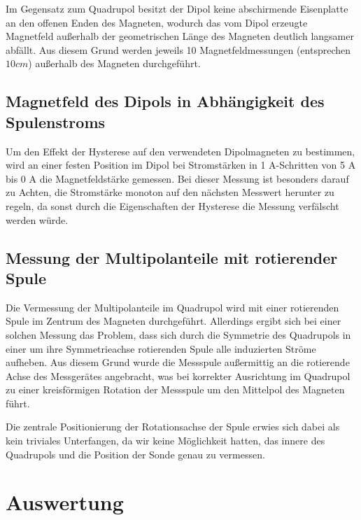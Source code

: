 \documentclass[bigchapter,colorback,accentcolor=tud4b,linedtoc,11pt]{tudreport}
\begin{document}
Im Gegensatz zum Quadrupol besitzt der Dipol keine abschirmende Eisenplatte an den offenen Enden des Magneten, wodurch das vom Dipol erzeugte Magnetfeld außerhalb der geometrischen Länge des Magneten deutlich langsamer abfällt. Aus diesem Grund werden jeweils 10 Magnetfeldmessungen (entsprechen $10 cm$) außerhalb des Magneten durchgeführt.

\section{Magnetfeld des Dipols in Abhängigkeit des Spulenstroms}

Um den Effekt der Hysterese auf den verwendeten Dipolmagneten zu bestimmen, wird an einer festen Position im Dipol bei Stromstärken in 1 A-Schritten von 5 A bis 0 A die Magnetfeldstärke gemessen. Bei dieser Messung ist besonders darauf zu Achten, die Stromstärke monoton auf den nächsten Messwert herunter zu regeln, da sonst durch die Eigenschaften der Hysterese die Messung verfälscht werden würde.

\section{Messung der Multipolanteile mit rotierender Spule}
Die Vermessung der Multipolanteile im Quadrupol wird mit einer rotierenden Spule im Zentrum des Magneten durchgeführt. Allerdings ergibt sich bei einer solchen Messung das Problem, dass sich durch die Symmetrie des Quadrupols in einer um ihre Symmetrieachse rotierenden Spule alle induzierten Ströme aufheben. Aus diesem Grund wurde die Messspule außermittig an die rotierende Achse des Messgerätes angebracht, was bei korrekter Ausrichtung im Quadrupol zu einer kreisförmigen Rotation der Messspule um den Mittelpol des Magneten führt.

Die zentrale Positionierung der Rotationsachse der Spule erwies sich dabei als kein triviales Unterfangen, da wir keine Möglichkeit hatten, das innere des Quadrupols und die Position der Sonde genau zu vermessen.


\chapter{Auswertung}
\end{document}
